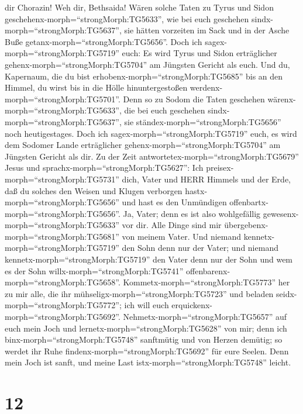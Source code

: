dir Chorazin! Weh dir, Bethsaida! Wären solche Taten zu Tyrus und Sidon
geschehenx-morph=``strongMorph:TG5633'', wie bei euch geschehen
sindx-morph=``strongMorph:TG5637'', sie hätten vorzeiten im Sack und in
der Asche Buße getanx-morph=``strongMorph:TG5656''.  Doch
ich sagex-morph=``strongMorph:TG5719'' euch: Es wird Tyrus und Sidon
erträglicher gehenx-morph=``strongMorph:TG5704'' am Jüngsten Gericht als
euch.  Und du, Kapernaum, die du bist
erhobenx-morph=``strongMorph:TG5685'' bis an den Himmel, du wirst bis in
die Hölle hinuntergestoßen werdenx-morph=``strongMorph:TG5701''. Denn so
zu Sodom die Taten geschehen wärenx-morph=``strongMorph:TG5633'', die
bei euch geschehen sindx-morph=``strongMorph:TG5637'', sie
ständex-morph=``strongMorph:TG5656'' noch heutigestages. 
Doch ich sagex-morph=``strongMorph:TG5719'' euch, es wird dem Sodomer
Lande erträglicher gehenx-morph=``strongMorph:TG5704'' am Jüngsten
Gericht als dir.  Zu der Zeit
antwortetex-morph=``strongMorph:TG5679'' Jesus und
sprachx-morph=``strongMorph:TG5627'': Ich
preisex-morph=``strongMorph:TG5731'' dich, Vater und HERR Himmels und
der Erde, daß du solches den Weisen und Klugen verborgen
hastx-morph=``strongMorph:TG5656'' und hast es den Unmündigen
offenbartx-morph=``strongMorph:TG5656''.  Ja, Vater; denn
es ist also wohlgefällig gewesenx-morph=``strongMorph:TG5633'' vor dir.
 Alle Dinge sind mir
übergebenx-morph=``strongMorph:TG5681'' von meinem Vater. Und niemand
kennetx-morph=``strongMorph:TG5719'' den Sohn denn nur der Vater; und
niemand kennetx-morph=``strongMorph:TG5719'' den Vater denn nur der Sohn
und wem es der Sohn willx-morph=``strongMorph:TG5741''
offenbarenx-morph=``strongMorph:TG5658''. 
Kommetx-morph=``strongMorph:TG5773'' her zu mir alle, die ihr
mühseligx-morph=``strongMorph:TG5723'' und beladen
seidx-morph=``strongMorph:TG5772''; ich will euch
erquickenx-morph=``strongMorph:TG5692''. 
Nehmetx-morph=``strongMorph:TG5657'' auf euch mein Joch und
lernetx-morph=``strongMorph:TG5628'' von mir; denn ich
binx-morph=``strongMorph:TG5748'' sanftmütig und von Herzen demütig; so
werdet ihr Ruhe findenx-morph=``strongMorph:TG5692'' für eure Seelen.
 Denn mein Joch ist sanft, und meine Last
istx-morph=``strongMorph:TG5748'' leicht.

\hypertarget{section-11}{%
\section{12}\label{section-11}}

